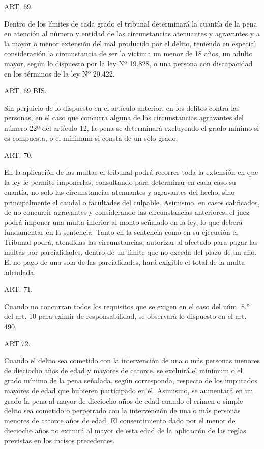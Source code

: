     ART. 69.

    Dentro de los límites de cada grado el tribunal determinará la cuantía de la pena en atención al número y entidad de las circunstancias atenuantes y agravantes y a la mayor o menor extensión del mal producido por el delito, teniendo en especial consideración la circunstancia de ser la víctima un menor de 18 años, un adulto mayor, según lo dispuesto por la ley Nº 19.828, o una persona con discapacidad en los términos de la ley Nº 20.422.



    ART. 69 BIS.

    Sin perjuicio de lo dispuesto en el artículo anterior, en los delitos contra las personas, en el caso que concurra alguna de las circunstancias agravantes del número 22º del artículo 12, la pena se determinará excluyendo el grado mínimo si es compuesta, o el mínimum si consta de un solo grado.


    ART. 70.

    En la aplicación de las multas el tribunal podrá recorrer toda la extensión en que la ley le permite imponerlas, consultando para determinar en cada caso su cuantía, no solo las circunstancias atenuantes y agravantes del hecho, sino principalmente el caudal o facultades del culpable. Asimismo, en casos calificados, de no concurrir agravantes y considerando las circunstancias anteriores, el juez podrá imponer una multa inferior al monto señalado en la ley, lo que deberá fundamentar en la sentencia.
    Tanto en la sentencia como en su ejecución el Tribunal podrá, atendidas las circunstancias, autorizar al afectado para pagar las multas por parcialidades, dentro de un límite que no exceda del plazo de un año. El no pago de una sola de las parcialidades, hará exigible el total de la multa adeudada.




    ART. 71.

    Cuando no concurran todos los requisitos que se exigen en el caso del núm. 8.° del art. 10 para eximir de responsabilidad, se observará lo dispuesto en el art. 490.



    ART.72.

    Cuando el delito sea cometido con la intervención de una o más personas menores de dieciocho años de edad y mayores de catorce, se excluirá el mínimum o el grado mínimo de la pena señalada, según corresponda, respecto de los imputados mayores de edad que hubieren participado en él.
    Asimismo, se aumentará en un grado la pena al mayor de dieciocho años de edad cuando el crimen o simple delito sea cometido o perpetrado con la intervención de una o más personas menores de catorce años de edad.
    El consentimiento dado por el menor de dieciocho años no eximirá al mayor de esta edad de la aplicación de las reglas previstas en los incisos precedentes.



